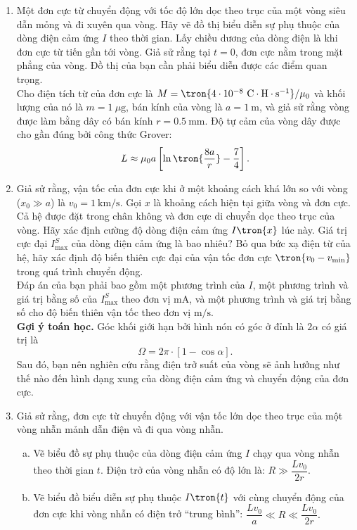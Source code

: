 \begin{vd}
\begin{enumerate}[1)]
    \item Một đơn cực từ chuyển động với tốc độ lớn dọc theo trục của một vòng siêu dẫn mỏng và đi xuyên qua vòng. Hãy vẽ đồ thị biểu diễn sự phụ thuộc của dòng điện cảm ứng $I$ theo thời gian. Lấy chiều dương của dòng điện là khi đơn cực từ tiến gần tới vòng. Giả sử rằng tại $t=0$, đơn cực nằm trong mặt phẳng của vòng. Đồ thị của bạn cần phải biểu diễn được các điểm quan trọng.\\
    Cho điện tích từ của đơn cực là $M=\tron{4\cdot10^{-8}~\mathrm{C\cdot H\cdot s^{-1}}}/\mu_0$ và khối lượng của nó là $m=1 ~\mu \mathrm{g}$, bán kính của vòng là $a=1~\mathrm{m}$, và giả sử rằng vòng được làm bằng dây có bán kính $r=0.5~\mathrm{mm}$. Độ tự cảm của vòng dây được cho gần đúng bởi công thức Grover: \[L\approx\mu_0a\left[\ln\tron{\dfrac{8a}{r}}-\dfrac{7}{4}\right].\]
    \item Giả sử rằng, vận tốc của đơn cực khi ở một khoảng cách khá lớn so với vòng ($x_0\gg a$) là $v_0=1~\mathrm{km/s}.$ Gọi $x$ là khoảng cách hiện tại giữa vòng và đơn cực. Cả hệ được đặt trong chân không và đơn cực di chuyển dọc theo trục của vòng. Hãy xác định cường độ dòng điện cảm ứng $I\tron{x}$ lúc này. Giá trị cực đại $I_{\max}^S$ của dòng điện cảm ứng là bao nhiêu? Bỏ qua bức xạ điện từ của hệ, hãy xác định độ biến thiên cực đại của vận tốc đơn cực $\tron{v_0-v_{\min}}$ trong quá trình chuyển động. \\
    Đáp án của bạn phải bao gồm một phương trình của $I$, một phương trình và giá trị bằng số của $I_{\max}^S$ theo đơn vị $\mathrm{mA}$, và một phương trình và giá trị bằng số cho độ biến thiên vận tốc theo đơn vị $\mathrm{m/s}$.\\
    \textbf{Gợi ý toán học.} Góc khối giới hạn bởi hình nón có góc ở đỉnh là $2\alpha$ có giá trị là \[\Omega=2\pi\cdot \left[1-\cos\alpha\right].\]
    Sau đó, bạn nên nghiên cứu rằng điện trở suất của vòng sẽ ảnh hưởng như thế nào đến hình dạng xung của dòng điện cảm ứng và chuyển động của đơn cực.
    \item Giả sử rằng, đơn cực từ chuyển động với vận tốc lớn dọc theo trục của một vòng nhẫn mảnh dẫn điện và đi qua vòng nhẫn.
    \begin{enumerate}[a)]
        \item Vẽ biểu đồ sự phụ thuộc của dòng điện cảm ứng $I$ chạy qua vòng nhẫn theo thời gian $t$. Điện trở của vòng nhẫn có độ lớn là: $R\gg\dfrac{Lv_0}{2r}.$
        \item Vẽ biểu đồ biểu diễn sự phụ thuộc $I\tron{t}$ với cùng chuyển động của đơn cực khi vòng nhẫn có điện trở ``trung bình'': $\dfrac{Lv_0}{a}\ll R\ll\dfrac{Lv_0}{2r}.$

\end{enumerate}
\end{enumerate}
\end{vd}
